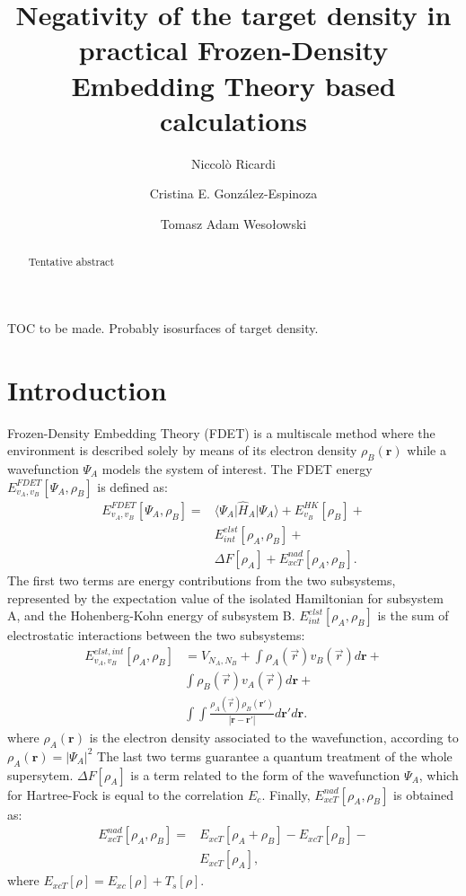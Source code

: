 \documentclass[journal=jctcce,manuscript=article, layout=twocolumn]{achemso}
\author{Niccol\`{o} Ricardi}
\author{Cristina E. Gonz\'{a}lez-Espinoza}
\author{Tomasz Adam Weso\l{}owski}
\affiliation[University of Geneva]
{Department of Physical Chemistry, University of Geneva, Geneva (Switzerland)}
\title[Negativity of the target density]
  {Negativity of the target density in practical Frozen-Density Embedding Theory based calculations}
\begin{document}
\begin{tocentry}

TOC to be made. Probably isosurfaces of target density.

\end{tocentry}


\begin{abstract}
Tentative abstract
\end{abstract}

\section{Introduction}
Frozen-Density Embedding Theory (FDET)\cite{Wesolowski2008, Wesolowski1993} is a multiscale method where the environment is described solely by means of its electron density $\rho_B(\mathbf{r})$ while a wavefunction $\Psi_A$ models the system of interest.
The FDET energy ${E}_{v_A,v_B}^{FDET}[\Psi_{A},\rho_B]$ is defined as:
\begin{align} \label{eq:E_FDET}
{E}_{v_A,v_B}^{FDET}[\Psi_{A},\rho_B] = & \langle\Psi_{A}\vert \hat{H}_A\vert \Psi_{A}\rangle + E^{HK}_{v_B}[\rho_B] + \\ \nonumber
& E^{elst}_{int}[\rho_A,\rho_B] + \\ \nonumber
& \Delta F[\rho_A] + E_{xcT}^{nad}[\rho_A,\rho_B]. 
\end{align}
The first two terms are energy contributions from the two subsystems, represented by the expectation value of the isolated Hamiltonian for subsystem A, and the Hohenberg-Kohn energy of subsystem B.
$E^{elst}_{int}[\rho_A,\rho_B]$ is the sum of electrostatic interactions between the two subsystems:
\begin{align} \label{eq:E_elst_int}
E^{elst,int}_{v_A,v_B}[\rho_A,\rho_B] & = V_{N_{A},N_{B}} + \int {\rho_A(\vec{r})v_B(\vec{r})}d\mathbf{r} + \\ \nonumber
& \int {\rho_B(\vec{r})v_A(\vec{r})}d\mathbf{r}   + \\ \nonumber
& \int\int \frac{\rho_A(\vec{r})\rho_B(\mathbf{r}')} {\left\vert \mathbf{r}-\mathbf{r}'\right\vert}d\mathbf{r}'d\mathbf{r}.
\end{align}
where $\rho_A(\mathbf{r})$ is the electron density associated to the wavefunction, according to $\rho_A(\mathbf{r}) = \vert \Psi_A \vert^2$
The last two terms guarantee a quantum treatment of the whole supersytem. $\Delta F[\rho_A]$ is a term\cite{Aquilante2011} related to the form of the wavefunction $\Psi_A$, which for Hartree-Fock is equal to the correlation $E_c$.
Finally, $E_{xcT}^{nad}[\rho_A,\rho_B]$  is obtained as:
\begin{align} \label{eq:E_xct_nad}
 E_{xcT}^{nad}[\rho_A,\rho_B] = & E_{xcT}^{}[\rho_A+\rho_B] - E_{xcT}^{}[\rho_B] - \\ \nonumber
 & E_{xcT}^{}[\rho_A],
\end{align}
where $E_{xcT}[\rho] = E_{xc}[\rho] + T_s[\rho]$.
\end{document}
